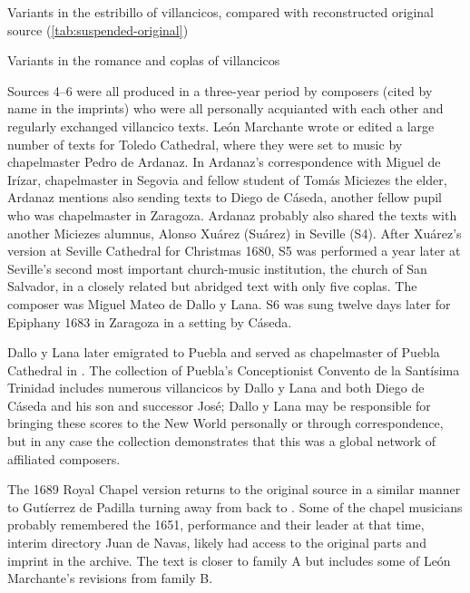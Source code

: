 {Variants in the estribillo of  villancicos,
compared with reconstructed original source (\cref{tab:suspended-original})}

{Variants in the romance and coplas of 
villancicos}

Sources 4--6 were all produced in a three-year period by composers (cited by
name in the imprints) who were all personally acquianted with each other and
regularly exchanged villancico texts.
León Marchante wrote or edited a large number of texts for Toledo Cathedral,
where they were set to music by chapelmaster Pedro de Ardanaz.%
In Ardanaz's correspondence with Miguel de Irízar, chapelmaster in Segovia and
fellow student of Tomás Miciezes the elder, Ardanaz mentions also sending texts
to Diego de Cáseda, another fellow pupil who was chapelmaster in Zaragoza.%
Ardanaz probably also shared the texts with another Miciezes alumnus, Alonso
Xuárez (Suárez) in Seville (S4).%
    \citXXX[Xuarez]
After Xuárez's version at Seville Cathedral for Christmas 1680, S5 was performed
a year later at Seville's second most important church-music institution, the
church of San Salvador, in a closely related but abridged text with only five
coplas.
The composer was Miguel Mateo de Dallo y Lana.%
    \citXXX[Dallo] %
S6 was sung twelve days later for Epiphany 1683 in Zaragoza in a setting by
Cáseda.

Dallo y Lana later emigrated to Puebla and served as chapelmaster of Puebla
Cathedral in \XXX[years].%
    \citXXX[Puebla]
The collection of Puebla's Conceptionist Convento de la Santísima Trinidad
includes numerous villancicos by Dallo y Lana and both Diego de Cáseda and his
son and successor José; Dallo y Lana may be responsible for bringing these
scores to the New World personally or through correspondence, but in any case
the collection demonstrates that this was a global network of affiliated
composers.%

The 1689 Royal Chapel version returns to the original source in a similar manner
to Gutíerrez de Padilla turning away from  back to
.
Some of the chapel musicians probably remembered the 1651, performance and their
leader at that time, interim directory Juan de Navas, likely had access to the
original parts and imprint in the archive.%
The text is closer to family A but includes some of León Marchante's
revisions from family B.

